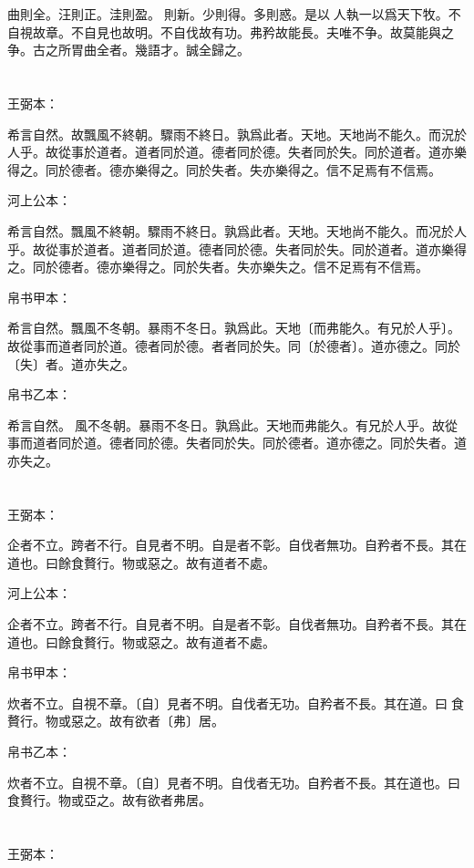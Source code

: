 \documentclass[a5paper]{ctexbook}
\begin{document}
    曲則全。汪則正。洼則盈。𧝬則新。少則得。多則惑。是以𦔻人執一以爲天下牧。不自視故章。不自見也故明。不自伐故有功。弗矜故能長。夫唯不争。故莫能與之争。古之所胃曲全者。幾語才。誠全歸之。

    \chapter{}
    王弼本：

    希言自然。故飄風不終朝。驟雨不終日。孰爲此者。天地。天地尚不能久。而況於人乎。故從事於道者。道者同於道。德者同於德。失者同於失。同於道者。道亦樂得之。同於德者。德亦樂得之。同於失者。失亦樂得之。信不足焉有不信焉。

    河上公本：

    希言自然。飄風不終朝。驟雨不終日。孰爲此者。天地。天地尚不能久。而况於人乎。故從事於道者。道者同於道。德者同於德。失者同於失。同於道者。道亦樂得之。同於德者。德亦樂得之。同於失者。失亦樂失之。信不足焉有不信焉。

    帛书甲本：

    希言自然。飄風不冬朝。暴雨不冬日。孰爲此。天地〔而弗能久。有兄於人乎〕。故從事而道者同於道。德者同於德。者者同於失。同〔於德者〕。道亦德之。同於〔失〕者。道亦失之。

    帛书乙本：

    希言自然。𠠕風不冬朝。暴雨不冬日。孰爲此。天地而弗能久。有兄於人乎。故從事而道者同於道。德者同於德。失者同於失。同於德者。道亦德之。同於失者。道亦失之。

    \chapter{}
    王弼本：

    企者不立。跨者不行。自見者不明。自是者不彰。自伐者無功。自矜者不長。其在道也。曰餘食贅行。物或惡之。故有道者不處。

    河上公本：

    企者不立。跨者不行。自見者不明。自是者不彰。自伐者無功。自矜者不長。其在道也。曰餘食贅行。物或惡之。故有道者不處。

    帛书甲本：

    炊者不立。自視不章。〔自〕見者不明。自伐者无功。自矜者不長。其在道。曰𥺌食贅行。物或惡之。故有欲者〔弗〕居。

    帛书乙本：

    炊者不立。自視不章。〔自〕見者不明。自伐者无功。自矜者不長。其在道也。曰𥺌食贅行。物或亞之。故有欲者弗居。

    \chapter{}
    王弼本：
\end{document}
